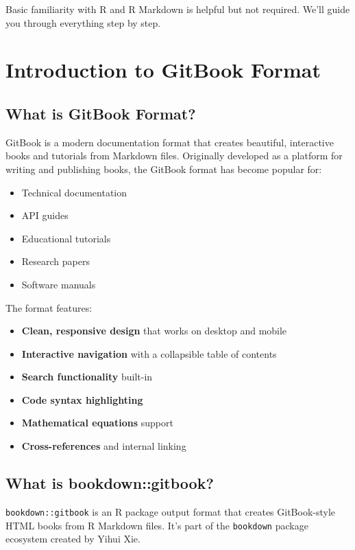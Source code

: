 \documentclass[
]{book}
\providecommand{\tightlist}{%
  \setlength{\itemsep}{0pt}\setlength{\parskip}{0pt}}
\begin{document}
Basic familiarity with R and R Markdown is helpful but not required. We'll guide you through everything step by step.

\chapter{Introduction to GitBook Format}\label{intro}

\section{What is GitBook Format?}\label{what-is-gitbook-format}

GitBook is a modern documentation format that creates beautiful, interactive books and tutorials from Markdown files. Originally developed as a platform for writing and publishing books, the GitBook format has become popular for:

\begin{itemize}
\tightlist
\item
  Technical documentation
\item
  API guides
\item
  Educational tutorials
\item
  Research papers
\item
  Software manuals
\end{itemize}

The format features:

\begin{itemize}
\tightlist
\item
  \textbf{Clean, responsive design} that works on desktop and mobile
\item
  \textbf{Interactive navigation} with a collapsible table of contents
\item
  \textbf{Search functionality} built-in
\item
  \textbf{Code syntax highlighting}
\item
  \textbf{Mathematical equations} support
\item
  \textbf{Cross-references} and internal linking
\end{itemize}

\section{What is bookdown::gitbook?}\label{what-is-bookdowngitbook}

\texttt{bookdown::gitbook} is an R package output format that creates GitBook-style HTML books from R Markdown files. It's part of the \texttt{bookdown} package ecosystem created by Yihui Xie.
\end{document}
